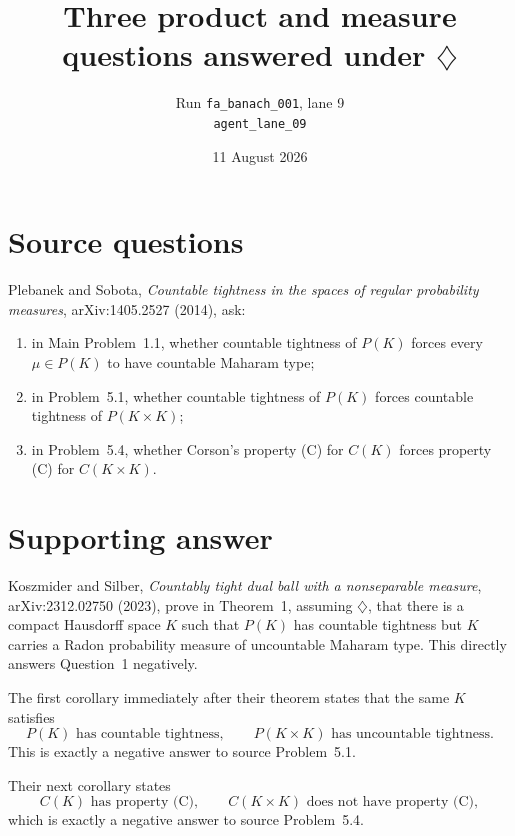 \documentclass[11pt]{article}
\title{Three product and measure questions answered under \(\diamondsuit\)}
\author{Run \texttt{fa\_banach\_001}, lane 9\\\texttt{agent\_lane\_09}}
\date{11 August 2026}
\newcommand{\PK}{P(K)}
\begin{document}
\maketitle

\begin{center}
\end{center}

\section*{Source questions}

Plebanek and Sobota, \emph{Countable tightness in the spaces of regular
probability measures}, arXiv:1405.2527 (2014), ask:
\begin{enumerate}
\item in Main Problem~1.1, whether countable tightness of \(\PK\) forces
every \(\mu\in\PK\) to have countable Maharam type;
\item in Problem~5.1, whether countable tightness of \(\PK\) forces countable
tightness of \(P(K\times K)\);
\item in Problem~5.4, whether Corson's property (C) for \(C(K)\) forces
property (C) for \(C(K\times K)\).
\end{enumerate}

\section*{Supporting answer}

Koszmider and Silber, \emph{Countably tight dual ball with a nonseparable
measure}, arXiv:2312.02750 (2023), prove in Theorem~1, assuming
\(\diamondsuit\), that there is a compact Hausdorff space \(K\) such that
\(\PK\) has countable tightness but \(K\) carries a Radon probability measure
of uncountable Maharam type.  This directly answers Question~1 negatively.

The first corollary immediately after their theorem states that the same
\(K\) satisfies
\[
  \PK\text{ has countable tightness},\qquad
  P(K\times K)\text{ has uncountable tightness}.
\]
This is exactly a negative answer to source Problem~5.1.

Their next corollary states
\[
 C(K)\text{ has property (C)},\qquad
 C(K\times K)\text{ does not have property (C)},
\]
which is exactly a negative answer to source Problem~5.4.
\end{document}
